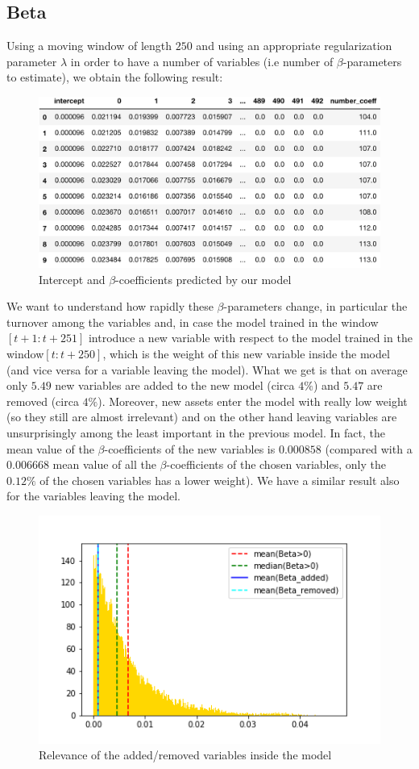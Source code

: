 \documentclass{article}%
\begin{document}
\subsection{Beta}
Using a moving window of length $250$ and using an appropriate regularization parameter $\lambda$ in order to have a number of variables (i.e number of $\beta$-parameters to estimate), we obtain the following result:
\begin{figure}[h!]
  \centering
  \includegraphics[scale=0.6]{beta_dataset.png}
  \caption{Intercept and $\beta$-coefficients predicted by our model}
  \label{beta_dataset}
\end{figure}
We want to understand how rapidly these $\beta$-parameters change, in particular the turnover among the variables and, in case the model trained in the window$[t+1:t+251]$  introduce a new variable with respect to the model trained in the window$[t:t+250]$, which is the weight of this new variable inside the model (and vice versa for a variable leaving the model). What we get is that on average only $5.49$ new variables are added to the new model (circa $4\%$) and $5.47$ are removed (circa $4\%$). Moreover, new assets enter the model with really low weight (so they still are almost irrelevant) and on the other hand leaving variables are unsurprisingly among the least important in the previous model. In fact, the mean value of the $\beta$-coefficients of the new variables is $0.000858$ (compared with a $0.006668$ mean value of all the $\beta$-coefficients of the chosen variables, only the $0.12\%$ of the chosen variables has a lower weight). We have a similar result also for the variables leaving the model.
\begin{figure}[h!]
  \centering
  \includegraphics[scale=0.6]{turnover.png}
  \caption{Relevance of the added/removed variables inside the model}
  \label{turnover}
\end{figure}
\end{document}
